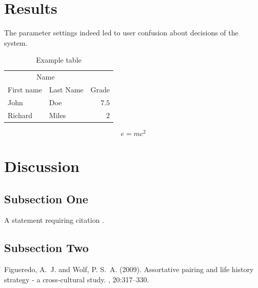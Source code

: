 \documentclass[twoside,twocolumn]{article}
\begin{document}
\section{Results}
The parameter settings indeed led to user confusion about decisions of the system. 

\begin{table}
\caption{Example table}
\centering
\begin{tabular}{llr}
\toprule
\multicolumn{2}{c}{Name} \\
\cmidrule(r){1-2}
First name & Last Name & Grade \\
\midrule
John & Doe & $7.5$ \\
Richard & Miles & $2$ \\
\bottomrule
\end{tabular}
\end{table}

\blindtext %

\begin{equation}
\label{eq:emc}
e = mc^2
\end{equation}

\blindtext %


\section{Discussion}

\subsection{Subsection One}

A statement requiring citation \cite{Figueredo:2009dg}.
\blindtext %

\subsection{Subsection Two}

\blindtext %


\begin{thebibliography}{99} %

Figueredo, A.~J. and Wolf, P. S.~A. (2009).
\newblock Assortative pairing and life history strategy - a cross-cultural
  study.
, 20:317--330.
 
\end{thebibliography}

\end{document}
